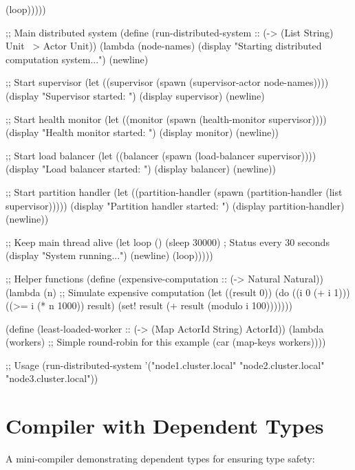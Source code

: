 \begin{example}
\begin{lambdustcode}
        (loop)))))

;; Main distributed system
(define (run-distributed-system :: (-> (List String) Unit ~> {Actor} Unit))
  (lambda (node-names)
    (display "Starting distributed computation system...") (newline)
    
    ;; Start supervisor
    (let ((supervisor (spawn (supervisor-actor node-names))))
      (display "Supervisor started: ") (display supervisor) (newline)
      
      ;; Start health monitor
      (let ((monitor (spawn (health-monitor supervisor))))
        (display "Health monitor started: ") (display monitor) (newline))
      
      ;; Start load balancer  
      (let ((balancer (spawn (load-balancer supervisor))))
        (display "Load balancer started: ") (display balancer) (newline))
      
      ;; Start partition handler
      (let ((partition-handler (spawn (partition-handler (list supervisor)))))
        (display "Partition handler started: ") (display partition-handler) (newline))
      
      ;; Keep main thread alive
      (let loop ()
        (sleep 30000)  ; Status every 30 seconds
        (display "System running...") (newline)
        (loop)))))

;; Helper functions
(define (expensive-computation :: (-> Natural Natural))
  (lambda (n)
    ;; Simulate expensive computation
    (let ((result 0))
      (do ((i 0 (+ i 1)))
          ((>= i (* n 1000)) result)
        (set! result (+ result (modulo i 100)))))))

(define (least-loaded-worker :: (-> (Map ActorId String) ActorId))
  (lambda (workers)
    ;; Simple round-robin for this example
    (car (map-keys workers))))

;; Usage
(run-distributed-system '("node1.cluster.local" 
                         "node2.cluster.local" 
                         "node3.cluster.local"))
\end{lambdustcode}
\end{example}

\section{Compiler with Dependent Types}
\label{sec:compiler-example}

A mini-compiler demonstrating dependent types for ensuring type safety:

